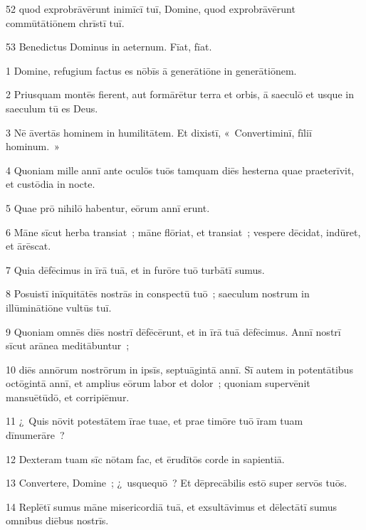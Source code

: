 \psalmVerse
  {\phantom{0}52}
  {quod exprobrāvērunt inimīcī tuī, Domine, quod exprobrāvērunt commūtātiōnem chrīstī tuī.}


\psalmVerse
  {\phantom{0}53}
  {Benedictus Dominus in aeternum. Fīat, fīat.}




\psalmVerse
  {\phantom{00}1}
  {Domine, refugium factus es nōbīs ā generātiōne in generātiōnem.}


\psalmVerse
  {\phantom{00}2}
  {Priusquam montēs fierent, aut formārētur terra et orbis, ā saeculō et usque in saeculum tū es Deus.}


\psalmVerse
  {\phantom{00}3}
  {Nē āvertās hominem in humilitātem. Et dixistī, «~Convertiminī, fīliī hominum.~»}


\psalmVerse
  {\phantom{00}4}
  {Quoniam mille annī ante oculōs tuōs tamquam diēs hesterna quae praeterīvit, et custōdia in nocte.}


\psalmVerse
  {\phantom{00}5}
  {Quae prō nihilō habentur, eōrum annī erunt.}


\psalmVerse
  {\phantom{00}6}
  {Māne sīcut herba transiat~; māne flōriat, et transiat~; vespere dēcidat, indūret, et ārēscat.}


\psalmVerse
  {\phantom{00}7}
  {Quia dēfēcimus in īrā tuā, et in furōre tuō turbātī sumus.}


\psalmVerse
  {\phantom{00}8}
  {Posuistī inīquitātēs nostrās in conspectū tuō~; saeculum nostrum in illūminātiōne vultūs tuī.}


\psalmVerse
  {\phantom{00}9}
  {Quoniam omnēs diēs nostrī dēfēcērunt, et in īrā tuā dēfēcimus. Annī nostrī sīcut arānea meditābuntur~;}


\psalmVerse
  {\phantom{0}10}
  {diēs annōrum nostrōrum in ipsīs, septuāgintā annī. Sī autem in potentātibus octōgintā annī, et amplius eōrum labor et dolor~; quoniam supervēnit mansuētūdō, et corripiēmur.}


\psalmVerse
  {\phantom{0}11}
  {¿~Quis nōvit potestātem īrae tuae, et prae timōre tuō īram tuam dīnumerāre~?}


\psalmVerse
  {\phantom{0}12}
  {Dexteram tuam sīc nōtam fac, et ērudītōs corde in sapientiā.}


\psalmVerse
  {\phantom{0}13}
  {Convertere, Domine~; ¿~usquequō~? Et dēprecābilis estō super servōs tuōs.}


\psalmVerse
  {\phantom{0}14}
  {Replētī sumus māne misericordiā tuā, et exsultāvimus et dēlectātī sumus omnibus diēbus nostrīs.}


